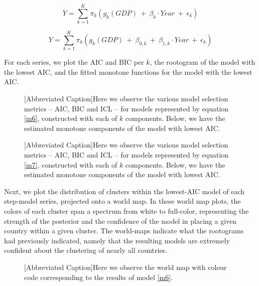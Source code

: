 \documentclass[10pt]{olplainarticle}\usepackage[]{graphicx}\usepackage[]{color}
\begin{document}
\begin{equation} \label{m6}
  Y = \sum_{k=1}^{K}\pi_k (g_{k} (GDP) \ +\  \beta_{k}\cdot Year \ +\ \epsilon_k)
\end{equation}

\begin{equation} \label{m7}
  Y = \sum_{k=1}^{K}\pi_k (g_{k} (GDP) \ +\  \beta_{0,k} \ +\ \beta_{1,k}\cdot Year \ +\ \epsilon_k)
\end{equation}

For each series, we plot the AIC and BIC per $k$, the rootogram of the model with the lowest AIC, and the fitted monotone functions for the model with the lowest AIC.











\begin{figure}

[Abbreviated Caption]{Here we observe the various model selection metrics -- AIC, BIC and ICL -- for models represented by equation \ref{m6}, constructed with each of $k$ components. Below, we have the estimated monotone components of the model with lowest AIC.}  
\end{figure}

\begin{figure}

[Abbreviated Caption]{Here we observe the various model selection metrics -- AIC, BIC and ICL -- for models represented by equation \ref{m7}, constructed with each of $k$ components. Below, we have the estimated monotone components of the model with lowest AIC.}
\end{figure}
 

Next, we plot the distribution of clusters within the lowest-AIC model of each step-model series, projected onto a world map. In these world map plots, the colors of each cluster span a spectrum from white to full-color, representing the strength of the posterior and the confidence of the model in placing a given country within a given cluster. The world-maps indicate what the rootograms had previously indicated, namely that the resulting models are extremely confident about the clustering of nearly all countries.

\begin{figure}

[Abbreviated Caption]{Here we observe the world map with colour code corresponding to the results of model \ref{m6}.}
\end{figure}
\end{document}
